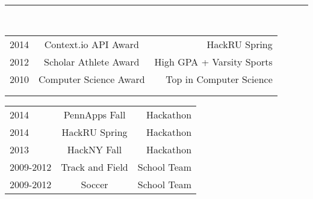 \documentclass[letterpaper]{deedy-resume} %
\begin{document}
\sectionspace

\hfill
{}
\vspace{1 mm}
\hrule height .1pt \leavevmode \\
\normalfont
\vspace{2 mm}
\normalfont
\fontsize{10pt}{12pt}
\selectfont
\begin{minipage}[t]{0.66\textwidth}
\begin{tabular}{l|c|r}
2014 & Context.io API Award & HackRU Spring \\
	2012 & Scholar Athlete Award & High GPA + Varsity Sports \\
	2010 & Computer Science Award & Top in Computer Science\\
	& &\\
	& &\\

\end{tabular}
\end{minipage}
\begin{minipage}[t]{0.33\textwidth}
\hfill	
\begin{tabular}{l|c|r}
2014 & PennApps Fall & Hackathon\\ 
2014 & HackRU Spring & Hackathon\\
2013 & HackNY Fall   & Hackathon\\
2009-2012 & Track and Field & School Team\\  	
2009-2012 & Soccer & School Team\\
\end{tabular}    
\end{minipage}




\sectionspace %



\sectionspace %




\end{document}
